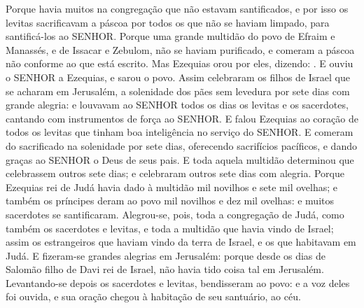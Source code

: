{  Porque havia muitos na congregação que não estavam santificados, e por isso os levitas sacrificavam a páscoa por todos os que não se haviam limpado, para santificá-los ao SENHOR.
  Porque uma grande multidão do povo de Efraim e Manassés, e de Issacar e Zebulom, não se haviam purificado, e comeram a páscoa não conforme ao que está escrito. Mas Ezequias orou por eles, dizendo: .
  E ouviu o SENHOR a Ezequias, e sarou o povo.
  Assim celebraram os filhos de Israel que se acharam em Jerusalém, a solenidade dos pães sem levedura por sete dias com grande alegria: e louvavam ao SENHOR todos os dias os levitas e os sacerdotes, cantando com instrumentos de força ao SENHOR.
  E falou Ezequias ao coração de todos os levitas que tinham boa inteligência no serviço do SENHOR. E comeram do sacrificado na solenidade por sete dias, oferecendo sacrifícios pacíficos, e dando graças ao SENHOR o Deus de seus pais.
  E toda aquela multidão determinou que celebrassem outros sete dias; e celebraram outros sete dias com alegria.
  Porque Ezequias rei de Judá havia dado à multidão mil novilhos e sete mil ovelhas; e também os príncipes deram ao povo mil novilhos e dez mil ovelhas: e muitos sacerdotes se santificaram.
  Alegrou-se, pois, toda a congregação de Judá, como também os sacerdotes e levitas, e toda a multidão que havia vindo de Israel; assim os estrangeiros que haviam vindo da terra de Israel, e os que habitavam em Judá.
  E fizeram-se grandes alegrias em Jerusalém: porque desde os dias de Salomão filho de Davi rei de Israel, não havia tido coisa tal em Jerusalém.
  Levantando-se depois os sacerdotes e levitas, bendisseram ao povo: e a voz deles foi ouvida, e sua oração chegou à habitação de seu santuário, ao céu.
\par }

